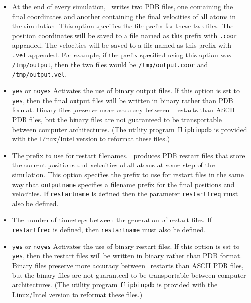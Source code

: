 \begin{itemize}
\item
{}
{\label{param:outputname}
At the end of every simulation, \NAMD\ writes two PDB files, one 
containing the final coordinates and another containing 
the final velocities of all atoms in the simulation.  
This option specifies the file prefix for these two files.  
The position coordinates will be saved to a file named as this prefix 
with {\tt .coor} appended.  
The velocities will be saved to a file 
named as this prefix with {\tt .vel} appended.  
For example, 
if the prefix specified using this option was {\tt /tmp/output}, 
then the two files 
would be {\tt /tmp/output.coor} and {\tt /tmp/output.vel}.}

\item
{}
{{\tt yes} or {\tt no}}{{\tt yes}}
{
Activates the use of binary output files.  
If this option is set to {\tt yes}, then the final output files 
will be written in binary rather than PDB format.  
Binary files preserve more accuracy between \NAMD\ restarts 
than ASCII PDB files, 
but the binary files are not guaranteed to be transportable 
between computer architectures.  
(The utility program {\tt flipbinpdb} is provided with the Linux/Intel
version to reformat these files.)
}

\item
{}
{
The prefix to use for restart filenames.  
\NAMD\ produces PDB restart files 
that store the current positions and velocities of all 
atoms at some step of the simulation.  
This option specifies the prefix to use for restart 
files in the same way that {\tt outputname} 
specifies a filename prefix for the final
positions and velocities.  
If {\tt restartname} is defined then
the parameter {\tt restartfreq} must also be defined.}

\item
{}
{
The number of timesteps between the generation of restart files.  
If {\tt restartfreq} is defined, then {\tt restartname} 
must also be defined.}

\item
{}
{{\tt yes} or {\tt no}}{{\tt yes}}
{
Activates the use of binary restart files.  
If this option is set to {\tt yes}, then the restart files
will be written in binary rather than PDB format.  
Binary files preserve more accuracy between \NAMD\ restarts 
than ASCII PDB files, 
but the binary files are not guaranteed to be transportable 
between computer architectures.  
(The utility program {\tt flipbinpdb} is provided with the Linux/Intel
version to reformat these files.)
}


\end{itemize}
